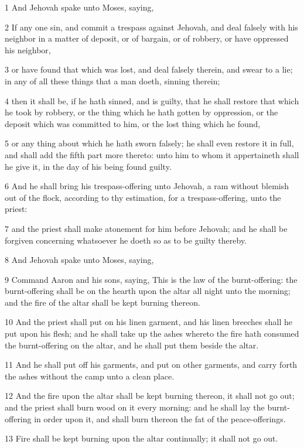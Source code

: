 \par 1 And Jehovah spake unto Moses, saying,
\par 2 If any one sin, and commit a trespass against Jehovah, and deal falsely with his neighbor in a matter of deposit, or of bargain, or of robbery, or have oppressed his neighbor,
\par 3 or have found that which was lost, and deal falsely therein, and swear to a lie; in any of all these things that a man doeth, sinning therein;
\par 4 then it shall be, if he hath sinned, and is guilty, that he shall restore that which he took by robbery, or the thing which he hath gotten by oppression, or the deposit which was committed to him, or the lost thing which he found,
\par 5 or any thing about which he hath sworn falsely; he shall even restore it in full, and shall add the fifth part more thereto: unto him to whom it appertaineth shall he give it, in the day of his being found guilty.
\par 6 And he shall bring his trespass-offering unto Jehovah, a ram without blemish out of the flock, according to thy estimation, for a trespass-offering, unto the priest:
\par 7 and the priest shall make atonement for him before Jehovah; and he shall be forgiven concerning whatsoever he doeth so as to be guilty thereby.
\par 8 And Jehovah spake unto Moses, saying,
\par 9 Command Aaron and his sons, saying, This is the law of the burnt-offering: the burnt-offering shall be on the hearth upon the altar all night unto the morning; and the fire of the altar shall be kept burning thereon.
\par 10 And the priest shall put on his linen garment, and his linen breeches shall he put upon his flesh; and he shall take up the ashes whereto the fire hath consumed the burnt-offering on the altar, and he shall put them beside the altar.
\par 11 And he shall put off his garments, and put on other garments, and carry forth the ashes without the camp unto a clean place.
\par 12 And the fire upon the altar shall be kept burning thereon, it shall not go out; and the priest shall burn wood on it every morning: and he shall lay the burnt-offering in order upon it, and shall burn thereon the fat of the peace-offerings.
\par 13 Fire shall be kept burning upon the altar continually; it shall not go out.
